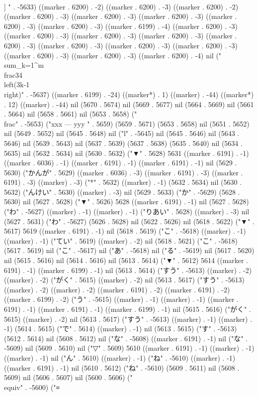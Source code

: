  \\]
" . -5633) ((marker . 6200) . -2) ((marker . 6200) . -3) ((marker . 6200) . -2) ((marker . 6200) . -3) ((marker . 6200) . -3) ((marker . 6200) . -3) ((marker . 6200) . -3) ((marker . 6200) . -3) ((marker . 6199) . -4) ((marker . 6200) . -3) ((marker . 6200) . -3) ((marker . 6200) . -3) ((marker . 6200) . -3) ((marker . 6200) . -3) ((marker . 6200) . -3) ((marker . 6200) . -3) ((marker . 6200) . -3) ((marker . 6200) . -3) ((marker . 6200) . -3) ((marker . 6200) . -4) nil ("  \\sum_{k=1}^{m}\\frac{3}{4}\\left(3k-1\\right)" . -5637) ((marker . 6199) . -24) ((marker*) . 1) ((marker) . -44) ((marker*) . 12) ((marker) . -44) nil (5670 . 5674) nil (5669 . 5677) nil (5664 . 5669) nil (5661 . 5664) nil (5658 . 5661) nil (5653 . 5658) ("\\frac" . -5653) ("xxx
---
yyy
" . 5659) (5659 . 5671) (5653 . 5658) nil (5651 . 5652) nil (5649 . 5652) nil (5645 . 5648) nil ("l" . -5645) nil (5645 . 5646) nil (5643 . 5646) nil (5639 . 5643) nil (5637 . 5639) (5637 . 5638) (5635 . 5640) nil (5634 . 5635) nil (5632 . 5634) nil (5630 . 5632) ("▼" . 5628) 5631 ((marker . 6191) . -1) ((marker . 6036) . -1) ((marker . 6191) . -1) ((marker . 6191) . -1) nil (5629 . 5630) ("かんが" . 5629) ((marker . 6036) . -3) ((marker . 6191) . -3) ((marker . 6191) . -3) ((marker) . -3) ("*" . 5632) ((marker) . -1) (5632 . 5634) nil (5630 . 5632) ("んけい" . 5630) ((marker) . -3) nil (5629 . 5633) ("か" . -5629) (5628 . 5630) nil (5627 . 5628) ("▼" . 5626) 5628 ((marker . 6191) . -1) nil (5627 . 5628) ("わ" . -5627) ((marker) . -1) ((marker) . -1) ("りあい" . 5628) ((marker) . -3) nil (5627 . 5631) ("わ" . -5627) (5626 . 5628) nil (5622 . 5626) nil (5618 . 5622) ("▼" . 5617) 5619 ((marker . 6191) . -1) nil (5618 . 5619) ("こ" . -5618) ((marker) . -1) ((marker) . -1) ("てい" . 5619) ((marker) . -2) nil (5618 . 5621) ("こ" . -5618) (5617 . 5619) nil ("こ" . -5617) nil ("あ" . -5618) nil ("る" . -5619) nil (5617 . 5620) nil (5615 . 5616) nil (5614 . 5616) nil (5613 . 5614) ("▼" . 5612) 5614 ((marker . 6191) . -1) ((marker . 6199) . -1) nil (5613 . 5614) ("すう" . -5613) ((marker) . -2) ((marker) . -2) ("がく" . 5615) ((marker) . -2) nil (5613 . 5617) ("すう" . -5613) ((marker) . -2) ((marker) . -2) ((marker . 6191) . -2) ((marker . 6191) . -2) ((marker . 6199) . -2) ("う" . -5615) ((marker) . -1) ((marker) . -1) ((marker . 6191) . -1) ((marker . 6191) . -1) ((marker . 6199) . -1) nil (5615 . 5616) ("がく" . 5615) ((marker) . -2) nil (5613 . 5617) ("すう" . -5613) ((marker) . -1) ((marker) . -1) (5614 . 5615) ("で" . 5614) ((marker) . -1) nil (5613 . 5615) ("す" . -5613) (5612 . 5614) nil (5608 . 5612) nil ("な" . -5608) ((marker . 6191) . -1) nil ("な" . -5609) nil (5609 . 5610) nil ("▽" . 5609) 5610 ((marker . 6191) . -1) ((marker) . -1) ((marker) . -1) nil ("ん" . 5610) ((marker) . -1) ("ね" . -5610) ((marker) . -1) ((marker . 6191) . -1) nil (5610 . 5612) ("ね" . -5610) (5609 . 5611) nil (5608 . 5609) nil (5606 . 5607) nil (5600 . 5606) ("\\equiv" . -5600) ("≡

